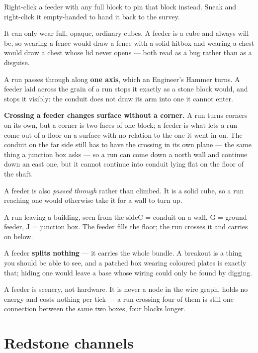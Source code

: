 Right-click a feeder with any full block to pin that block instead. Sneak and right-click it
empty-handed to hand it back to the survey.

\begin{ietip}
It can only wear full, opaque, ordinary cubes. A feeder is a cube and always will be, so wearing a
fence would draw a fence with a solid hitbox and wearing a chest would draw a chest whose lid never
opens --- both read as a bug rather than as a disguise.
\end{ietip}

A run passes through along \textbf{one axis}, which an Engineer's Hammer turns. A feeder laid across
the grain of a run stops it exactly as a stone block would, and stops it visibly: the conduit does
not draw its arm into one it cannot enter.

\textbf{Crossing a feeder changes surface without a corner.} A run turns corners on its own, but a
corner is two faces of one block; a feeder is what lets a run come out of a floor on a surface with
no relation to the one it went in on. The conduit on the far side still has to have the crossing in
its own plane --- the same thing a junction box asks --- so a run can come down a north wall and
continue down an east one, but it cannot continue into conduit lying flat on the floor of the shaft.

A feeder is also \emph{passed through} rather than climbed. It is a solid cube, so a run reaching one
would otherwise take it for a wall to turn up.

\begin{mbplan}{A run leaving a building, seen from the side}{C = conduit on a wall, G = ground
feeder, J = junction box. The feeder fills the floor; the run crosses it and carries on below.}
\end{mbplan}

A feeder \textbf{splits nothing} --- it carries the whole bundle. A breakout is a thing you should be
able to see, and a patched box wearing coloured plates is exactly that; hiding one would leave a base
whose wiring could only be found by digging.

\begin{ietip}
A feeder is scenery, not hardware. It is never a node in the wire graph, holds no energy and costs
nothing per tick --- a run crossing four of them is still one connection between the same two boxes,
four blocks longer.
\end{ietip}

\section{Redstone channels}


